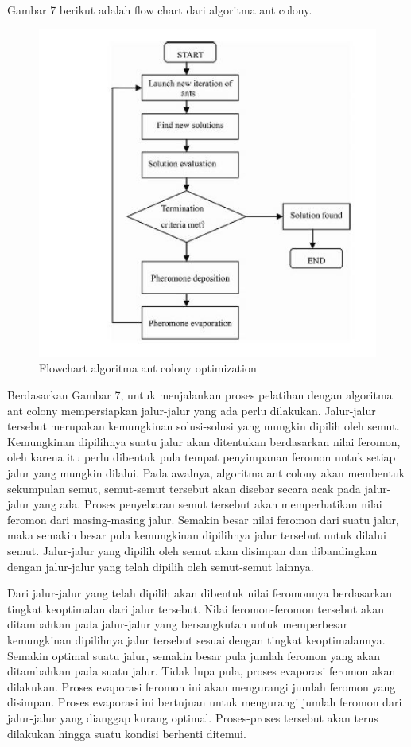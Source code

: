 \documentclass[a4paper,twoside]{article}
\begin{document}
\begin{enumerate}
\begin{itemize}
\begin{enumerate}
			Gambar 7 berikut adalah flow chart dari algoritma ant colony.
			\begin{figure}[H]
				\centering
				\includegraphics[scale=0.80]{gambar7}
				\caption[Flowchart ACO] {Flowchart algoritma ant colony optimization}
				\label{fig:flowchartACO}
			\end{figure}
			Berdasarkan Gambar 7, untuk menjalankan proses pelatihan dengan algoritma ant colony mempersiapkan
			jalur-jalur yang ada perlu dilakukan. Jalur-jalur tersebut merupakan kemungkinan
			solusi-solusi yang mungkin dipilih oleh semut. Kemungkinan dipilihnya suatu jalur akan ditentukan
			berdasarkan nilai feromon, oleh karena itu perlu dibentuk pula tempat penyimpanan feromon untuk
			setiap jalur yang mungkin dilalui.
			Pada awalnya, algoritma ant colony akan membentuk sekumpulan semut, semut-semut tersebut
			akan disebar secara acak pada jalur-jalur yang ada. Proses penyebaran semut tersebut akan memperhatikan
			nilai feromon dari masing-masing jalur. Semakin besar nilai feromon dari suatu jalur,
			maka semakin besar pula kemungkinan dipilihnya jalur tersebut untuk dilalui semut. Jalur-jalur
			yang dipilih oleh semut akan disimpan dan dibandingkan dengan jalur-jalur yang telah dipilih oleh
			semut-semut lainnya.
			
			Dari jalur-jalur yang telah dipilih akan dibentuk nilai feromonnya berdasarkan tingkat keoptimalan
			dari jalur tersebut. Nilai feromon-feromon tersebut akan ditambahkan pada jalur-jalur
			yang bersangkutan untuk memperbesar kemungkinan dipilihnya jalur tersebut sesuai dengan tingkat
			keoptimalannya. Semakin optimal suatu jalur, semakin besar pula jumlah feromon yang akan
			ditambahkan pada suatu jalur.
			Tidak lupa pula, proses evaporasi feromon akan dilakukan. Proses evaporasi feromon ini akan
			mengurangi jumlah feromon yang disimpan. Proses evaporasi ini bertujuan untuk mengurangi
			jumlah feromon dari jalur-jalur yang dianggap kurang optimal. Proses-proses tersebut akan terus
			dilakukan hingga suatu kondisi berhenti ditemui.
			

\end{enumerate}
\end{itemize}
\end{enumerate}
\end{document}
